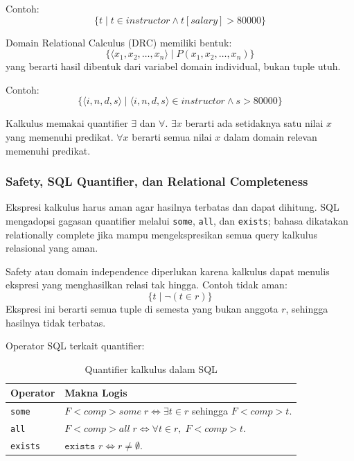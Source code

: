 Contoh:
\[
    \{t \mid t \in instructor \land t[salary] > 80000\}
\]

Domain Relational Calculus (DRC) memiliki bentuk:
\begin{equation}
    \{\langle x_1,x_2,\ldots,x_n\rangle \mid P(x_1,x_2,\ldots,x_n)\}
    \label{eq:drc}
\end{equation}
yang berarti hasil dibentuk dari variabel domain individual, bukan tuple utuh.

Contoh:
\[
    \{\langle i,n,d,s\rangle \mid \langle i,n,d,s\rangle \in instructor \land s > 80000\}
\]

Kalkulus memakai quantifier \(\exists\) dan \(\forall\). \(\exists x\) berarti ada setidaknya satu nilai \(x\) yang memenuhi predikat. \(\forall x\) berarti semua nilai \(x\) dalam domain relevan memenuhi predikat.

\subsubsection{Safety, SQL Quantifier, dan Relational Completeness}

\begin{jawab}
Ekspresi kalkulus harus aman agar hasilnya terbatas dan dapat dihitung. SQL mengadopsi gagasan quantifier melalui \texttt{some}, \texttt{all}, dan \texttt{exists}; bahasa dikatakan relationally complete jika mampu mengekspresikan semua query kalkulus relasional yang aman.
\end{jawab}

Safety atau domain independence diperlukan karena kalkulus dapat menulis ekspresi yang menghasilkan relasi tak hingga. Contoh tidak aman:
\[
    \{t \mid \neg(t \in r)\}
\]
Ekspresi ini berarti semua tuple di semesta yang bukan anggota \(r\), sehingga hasilnya tidak terbatas.

Operator SQL terkait quantifier:
\begin{table}[H]
\centering
\begin{tabularx}{\textwidth}{|L{0.18\textwidth}|X|}
\hline
\textbf{Operator} & \textbf{Makna Logis} \\
\hline
\texttt{some} & \(F <comp> some\; r \Leftrightarrow \exists t \in r\) sehingga \(F <comp> t\). \\
\hline
\texttt{all} & \(F <comp> all\; r \Leftrightarrow \forall t \in r,\; F <comp> t\). \\
\hline
\texttt{exists} & \(\texttt{exists } r \Leftrightarrow r \neq \emptyset\). \\
\hline
\end{tabularx}
\caption{Quantifier kalkulus dalam SQL}
\label{tab:sql-quantifier}
\end{table}

